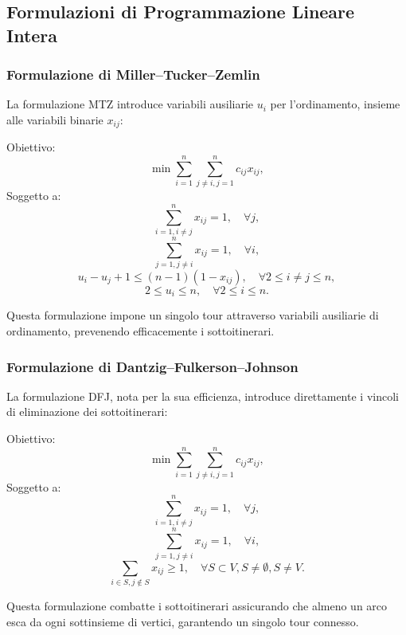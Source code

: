 \subsection{Formulazioni di Programmazione Lineare Intera}

\subsubsection{Formulazione di Miller–Tucker–Zemlin}

La formulazione \Gls{MTZ} introduce variabili ausiliarie \(u_i\) per l'ordinamento, insieme alle variabili binarie \(x_{ij}\):

Obiettivo:
\[
	\min \sum_{i=1}^{n} \sum_{j \ne i, j=1}^{n} c_{ij} x_{ij},
\]
Soggetto a:
\[
	\sum_{i=1, i \ne j}^{n} x_{ij} = 1, \quad \forall j,
\]
\[
	\sum_{j=1, j \ne i}^{n} x_{ij} = 1, \quad \forall i,
\]
\[
	u_i - u_j + 1 \le (n-1)(1 - x_{ij}), \quad \forall 2 \le i \ne j \le n,
\]
\[
	2 \le u_i \le n, \quad \forall 2 \le i \le n.
\]

Questa formulazione impone un singolo tour attraverso variabili ausiliarie di ordinamento, prevenendo efficacemente i sottoitinerari.

\subsubsection{Formulazione di Dantzig–Fulkerson–Johnson}

La formulazione DFJ, nota per la sua efficienza, introduce direttamente i vincoli di eliminazione dei sottoitinerari:

Obiettivo:
\[
	\min \sum_{i=1}^{n} \sum_{j \ne i, j=1}^{n} c_{ij} x_{ij},
\]
Soggetto a:
\[
	\sum_{i=1, i \ne j}^{n} x_{ij} = 1, \quad \forall j,
\]
\[
	\sum_{j=1, j \ne i}^{n} x_{ij} = 1, \quad \forall i,
\]
\[
	\sum_{i \in S, j \notin S} x_{ij} \ge 1, \quad \forall S \subset V, S \ne \emptyset, S \ne V.
\]


Questa formulazione combatte i sottoitinerari assicurando che almeno un arco esca da ogni sottinsieme di vertici, garantendo un singolo tour connesso.


